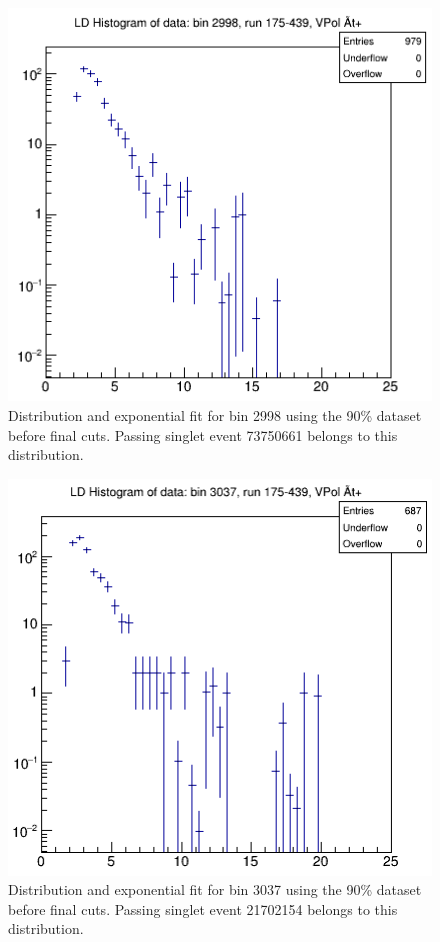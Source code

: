\begin{figure}
\centering
\includegraphics[width=1.0\textwidth]{figures/diffHist02998_175_439_V.png}
\caption{Distribution and exponential fit for bin 2998 using the 90\% dataset before final cuts. Passing singlet event 73750661 belongs to this distribution.}
\label{2998_90pc}
\end{figure}



\begin{figure}
\centering
\includegraphics[width=1.0\textwidth]{figures/diffHist03037_175_439_V.png}
\caption{Distribution and exponential fit for bin 3037 using the 90\% dataset before final cuts. Passing singlet event 21702154 belongs to this distribution.}
\label{3037_90pc}
\end{figure}





